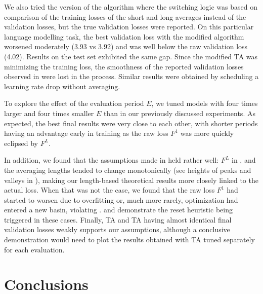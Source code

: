 \documentclass[twocolumn]{article}
\newcommand{\tta}{\liningnums{2}TA}
\begin{document}
We also tried the version of the algorithm where the switching logic was based on comparison of the training losses of the short and long averages instead of the validation losses, but the true validation losses were reported.
On this particular language modelling task, the best validation loss with the modified algorithm worsened moderately (3.93 vs 3.92) and was well below the raw validation loss (4.02).
Results on the test set exhibited the same gap.
Since the modified \tta{} was minimizing the training loss, the smoothness of the reported validation losses observed in  were lost in the process.
Similar results were obtained by scheduling a learning rate drop without averaging.

To explore the effect of the evaluation period $E$, we tuned models with four times larger and four times smaller $E$ than in our previously discussed experiments.
As expected, the best final results were very close to each other, with shorter periods having an advantage early in training as the raw loss $F^1$ was more quickly eclipsed by $F^L$.

In addition, we found that the assumptions made in  held rather well: $F^L$ in , and the averaging lengths tended to change monotonically (see heights of peaks and valleys in ), making our length-based theoretical results more closely linked to the actual loss.
When that was not the case, we found that the raw loss $F^1$ had started to worsen due to overfitting or, much more rarely, optimization had entered a new basin, violating .
 and  demonstrate the reset heuristic being triggered in these cases.
Finally, TA and \tta{} having almost identical final validation losses weakly supports our assumptions, although a conclusive demonstration would need to plot the results obtained with TA tuned separately for each evaluation.

\section{Conclusions}
\end{document}
